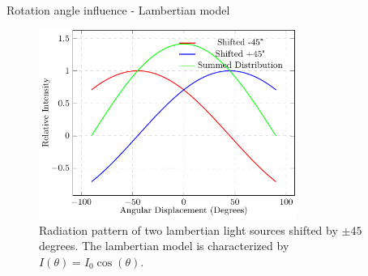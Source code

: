 \documentclass{beamer}
\begin{document}
	\begin{frame}{Rotation angle influence - Lambertian model}

		\begin {figure}
			\centering
			\includegraphics[width=0.75\textwidth]{../docs/fig/plots/lambertian/3lambertian.pdf}
			\caption{Radiation pattern of two lambertian light sources shifted by $\pm 45$ degrees. The lambertian model is characterized by $I(\theta) = I_0\cos(\theta)$.}
			\label{fig:lambert_combined}
		\end{figure}
	\end{frame}
\end{document}

